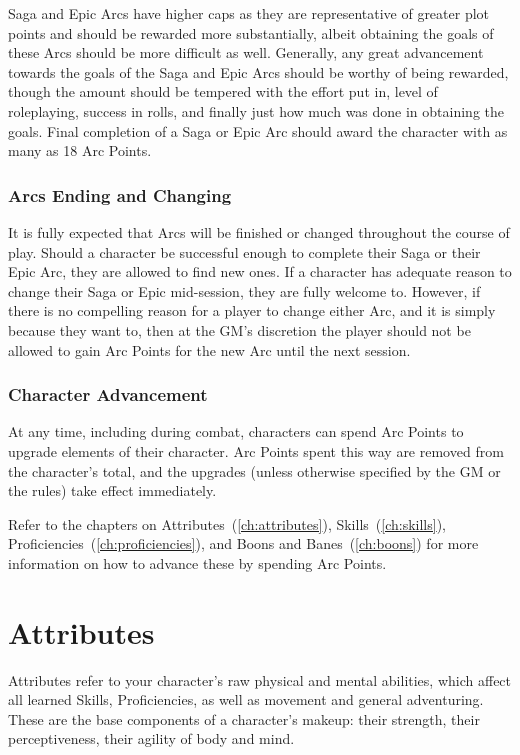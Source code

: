 \documentclass[oneside,11pt,english]{book}
\begin{document}
Saga and Epic Arcs have higher caps as they are representative of greater plot points and should be 
rewarded more substantially, albeit obtaining the goals of these Arcs should be more difficult as well. 
Generally, any great advancement towards the goals of the Saga and Epic Arcs should be worthy of being 
rewarded, though the amount should be tempered with the effort put in, level of roleplaying, success in 
rolls, and finally just how much was done in obtaining the goals. Final completion of a Saga or Epic Arc 
should award the character with as many as 18 Arc Points. 

 
\subsection{Arcs Ending and Changing}
It is fully expected that Arcs will be finished or changed throughout the course of play. Should a character 
be successful enough to complete their Saga or their Epic Arc, they are allowed to find new ones. If a 
character has adequate reason to change their Saga or Epic mid-session, they are fully welcome to. 
However, if there is no compelling reason for a player to change either Arc, and it is simply because they 
want to, then at the GM’s discretion the player should not be allowed to gain Arc Points for the new Arc 
until the next session. 


\subsection{Character Advancement}
At any time, including during combat, characters can spend Arc Points to upgrade elements of their 
character. Arc Points spent this way are removed from the character’s total, and the upgrades (unless 
otherwise specified by the GM or the rules) take effect immediately. 


Refer to the chapters on Attributes~(\autoref{ch:attributes}), Skills~(\autoref{ch:skills}), Proficiencies~(\autoref{ch:proficiencies}), and Boons and Banes~(\autoref{ch:boons}) for more information on how to advance these by spending Arc Points. 
\chapter{Attributes}\label{ch:attributes}
\startcontents[chapters]
\clearpage
Attributes refer to your character’s raw physical and mental abilities, which affect all learned Skills, 
Proficiencies, as well as movement and general adventuring. These are the base components of a 
character’s makeup: their strength, their perceptiveness, their agility of body and mind. 
\end{document}
